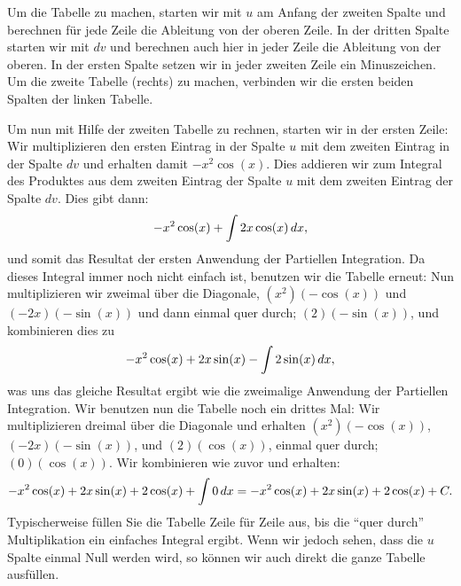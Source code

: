 Um die Tabelle zu machen, starten wir mit $u$ am Anfang der zweiten Spalte und berechnen für jede Zeile die Ableitung von der oberen Zeile. In der dritten Spalte starten wir mit $dv$ und berechnen auch hier in jeder Zeile die Ableitung von der oberen. In der ersten Spalte setzen wir in jeder zweiten Zeile ein Minuszeichen. Um die zweite Tabelle (rechts) zu machen, verbinden wir die ersten beiden Spalten der linken Tabelle. 

Um nun mit Hilfe der zweiten Tabelle zu rechnen, starten wir in der ersten Zeile: Wir multiplizieren den ersten Eintrag in der Spalte $u$ mit dem zweiten Eintrag in der Spalte $dv$ und erhalten damit $-x^2\cos(x)$. Dies addieren wir zum Integral des Produktes aus dem zweiten Eintrag der Spalte $u$ mit dem zweiten Eintrag der Spalte $dv$. Dies gibt dann:
$$-x^2\cos(x)+\int 2x\cos(x)\, d x,$$
und somit das Resultat der ersten Anwendung der Partiellen Integration. Da dieses Integral immer noch nicht einfach ist, benutzen wir die Tabelle erneut:
Nun multiplizieren wir zweimal über die Diagonale, $(x^2)(-\cos(x))$ und
$(-2x)(-\sin(x))$ und dann einmal quer durch; $(2)(-\sin(x))$, und kombinieren dies zu
\[
-x^2\cos(x)+2x\sin(x)-\int 2\sin(x)\, d x,
\]
was uns das gleiche Resultat ergibt wie die zweimalige Anwendung der Partiellen Integration. Wir benutzen nun die Tabelle noch ein drittes Mal:
Wir multiplizieren dreimal über die Diagonale und erhalten $(x^2)(-\cos(x))$, $(-2x)(-\sin(x))$, und $(2)(\cos(x))$, einmal quer durch; $(0)(\cos(x))$. Wir kombinieren wie zuvor und erhalten:
\[
  -x^2\cos(x)+2x\sin(x) +2\cos(x)+\int 0\, d x=
  -x^2\cos(x)+2x\sin(x) +2\cos(x)+C.
\]
Typischerweise füllen Sie die Tabelle Zeile für Zeile aus, bis die ``quer durch'' Multiplikation ein einfaches Integral ergibt. Wenn wir jedoch sehen, dass die $u$ Spalte einmal Null werden wird, so können wir auch direkt die ganze Tabelle ausfüllen.

